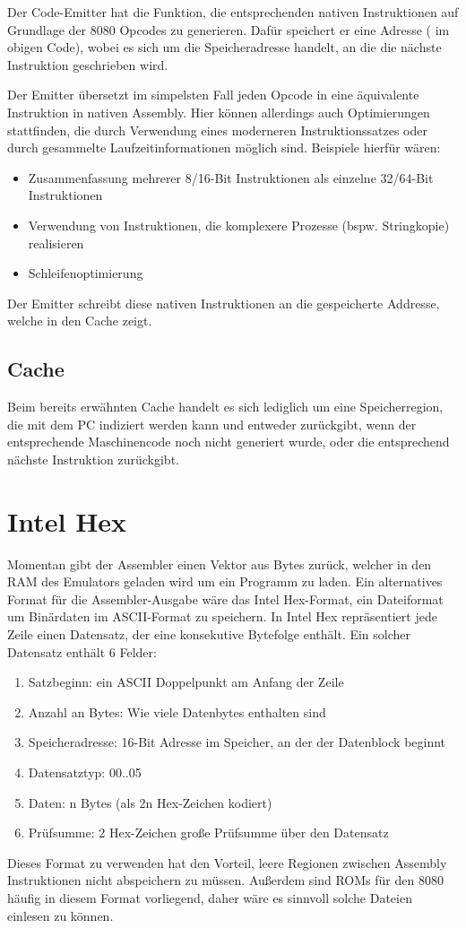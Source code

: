 Der Code-Emitter hat die Funktion, die entsprechenden nativen Instruktionen auf Grundlage der 8080 Opcodes zu generieren. Dafür speichert er eine Adresse ( im obigen Code), wobei es sich um die Speicheradresse handelt, an die die nächste Instruktion geschrieben wird.

Der Emitter übersetzt im simpelsten Fall jeden Opcode in eine äquivalente Instruktion in nativen Assembly. Hier können allerdings auch Optimierungen stattfinden, die durch Verwendung eines moderneren Instruktionssatzes oder durch gesammelte Laufzeitinformationen möglich sind. Beispiele hierfür wären:

\begin{itemize}
    \item Zusammenfassung mehrerer 8/16-Bit Instruktionen als einzelne 32/64-Bit Instruktionen
    \item Verwendung von Instruktionen, die komplexere Prozesse (bspw. Stringkopie) realisieren
    \item Schleifenoptimierung
\end{itemize}

Der Emitter schreibt diese nativen Instruktionen an die gespeicherte Addresse, welche in den Cache zeigt.

\subsection{Cache}

Beim bereits erwähnten Cache handelt es sich lediglich um eine Speicherregion, die mit dem PC indiziert werden kann und entweder  zurückgibt, wenn der entsprechende Maschinencode noch nicht generiert wurde, oder die entsprechend nächste Instruktion zurückgibt.


\section{Intel Hex}

Momentan gibt der Assembler einen Vektor aus Bytes zurück, welcher in den RAM des Emulators geladen wird um ein Programm zu laden. Ein alternatives Format für die Assembler-Ausgabe wäre das Intel Hex-Format, ein Dateiformat um Binärdaten im ASCII-Format zu speichern. In Intel Hex repräsentiert jede Zeile einen Datensatz, der eine konsekutive Bytefolge enthält. Ein solcher Datensatz enthält 6 Felder:

\begin{enumerate}
\item Satzbeginn: ein ASCII Doppelpunkt am Anfang der Zeile
\item Anzahl an Bytes: Wie viele Datenbytes enthalten sind
\item Speicheradresse: 16-Bit Adresse im Speicher, an der der Datenblock beginnt
\item Datensatztyp: 00..05
\item Daten: n Bytes (als 2n Hex-Zeichen kodiert)
\item Prüfsumme: 2 Hex-Zeichen große Prüfsumme über den Datensatz
\end{enumerate}

Dieses Format zu verwenden hat den Vorteil, leere Regionen zwischen Assembly Instruktionen nicht abspeichern zu müssen. Außerdem sind ROMs für den 8080 häufig in diesem Format vorliegend, daher wäre es sinnvoll solche Dateien einlesen zu können.
